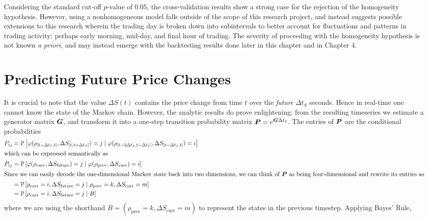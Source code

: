 Considering the standard cut-off $p$-value of 0.05, the cross-validation results show a strong case for the rejection of the homogeneity hypothesis. However, using a nonhomogeneous model falls outside of the scope of this research project, and instead suggests possible extensions to this research wherein the trading day is broken down into subintervals to better account for fluctuations and patterns in trading activity; perhaps early morning, mid-day, and final hour of trading. The severity of proceeding with the homogeneity hypothesis is not known \textit{a priori}, and may instead emerge with the backtesting results done later in this chapter and in Chapter 4.

\section{Predicting Future Price Changes}
It is crucial to note that the value $\Delta S(t)$ contains the price change from time $t$ over the \textit{future} $\Delta t_S$ seconds. Hence in real-time one cannot know the state of the Markov chain. However, the analytic results do prove enlightening: from the resulting timeseries we estimate a generator matrix $\boldsymbol{G}$, and transform it into a one-step transition probability matrix $\boldsymbol{P} = e^{\boldsymbol{G}\Delta t_I}$. The entries of $\boldsymbol{P}$ are the conditional probabilities 
\begin{align}
P_{ij} & = \mathbb{P}\left[ \varphi( \rho_{[t-\Delta t_I, t]}, \Delta S_{[t,t+\Delta t_S]}) = j \; | \; \varphi( \rho_{[t-2\Delta t_I, t-\Delta t_I]}, \Delta S_{[t-\Delta t_I, t]} ) = i \right] \label{eq:POneStepUgly} \\
\intertext{which can be expressed semantically as}
P_{ij} & = \mathbb{P}\left[ \varphi( \rho_\text{curr}, \Delta S_\text{future}) = j \; | \; \varphi( \rho_\text{prev}, \Delta S_\text{curr} ) = i \right] \label{eq:POneStepNice} \\
\intertext{Since we can easily decode the one-dimensional Markov state back into two dimensions, we can think of $\boldsymbol{P}$ as being four-dimensional and rewrite its entries as}
& = \mathbb{P}\left[ \rho_\text{curr} = i,  \Delta S_\text{future} = j \; | \; \rho_\text{prev} = k, \Delta S_\text{curr} = m \right] \\
& = \mathbb{P}\left[ \rho_\text{curr} = i,  \Delta S_\text{future} = j \; | \; B \right]
\end{align}
where we are using the shorthand $B = (\rho_\text{prev} = k, \Delta S_\text{curr} = m)$ to represent the states in the previous timestep. Applying Bayes' Rule,
